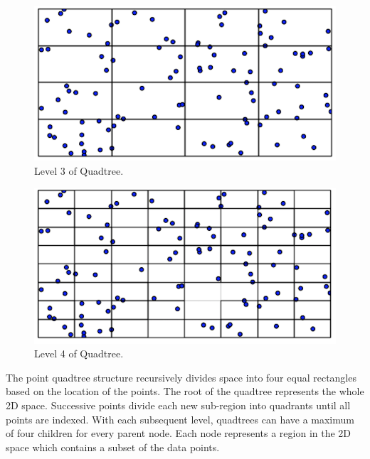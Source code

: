   \begin{figure}[H]    
  \centering
  \vspace{0.5in}
  \includegraphics[scale=0.5]{Images/Quadtree_construction3}
  \vspace{0.5in}
  \caption{Level 3 of Quadtree.}
  \label{fig:quadtree_construction3} 
  \end{figure}

 \begin{figure}[H]    
 \centering
 \vspace{0.5in}
 \includegraphics[scale=0.5]{Images/Quadtree_construction4}
 \vspace{0.5in}
 \caption{Level 4 of Quadtree.}
 \label{fig:quadtree_construction4}
 \end{figure}


The point quadtree structure recursively divides space into four equal 
rectangles based on the location of the points. The root of the quadtree 
represents the whole 2D space. Successive points divide each 
new sub-region into quadrants until all points are indexed. With each 
subsequent level, quadtrees can have a maximum of four children for 
every parent node. Each node represents a region in the 2D space
which contains a subset of the data points.

